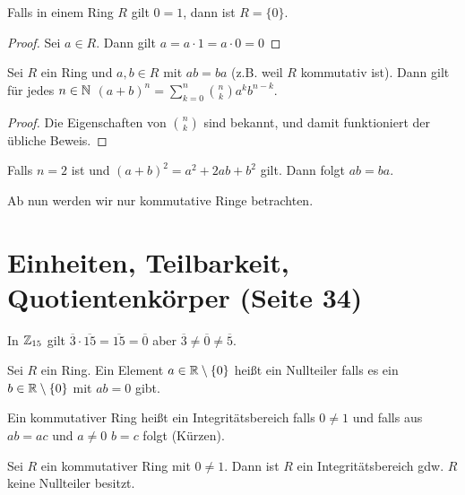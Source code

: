 \begin{lemma}
	Falls in einem Ring $R$ gilt $0=1$, dann ist  $R = \{0\}$.
\end{lemma}

\begin{proof}
	Sei $a \in R$. Dann gilt $a = a\cdot 1 = a \cdot 0 = 0$
\end{proof}

\begin{lemma}[Binomialformel]
	Sei $R$ ein Ring und $a,b \in R$ mit $ab = ba$ (z.B. weil $R$ kommutativ ist).
	Dann gilt für jedes $n \in \mathbb{N}$ $(a+b)^{n} = \sum_{k=0}^{n} \binom{n}{k} a^{k} b^{n-k}$.
\end{lemma}

\begin{proof}
	Die Eigenschaften von $\binom{n}{k}$ sind bekannt, und damit funktioniert der übliche Beweis.
\end{proof}

Falls $n = 2$ ist und $(a+b)^2 = a^2 + 2ab + b^2$ gilt. Dann folgt $ab = ba$.

\begin{attention}
	Ab nun werden wir nur kommutative Ringe betrachten.
\end{attention}

\section{Einheiten, Teilbarkeit, Quotientenkörper (Seite 34)}
\begin{eg}
	In $\mathbb{Z}_{15}$ gilt $\overline{3} \cdot \overline{15} = \overline{15} = \overline{0}$ aber  $\overline{3} \neq \overline{0} \neq \overline{5}$.
\end{eg}

\begin{definition}
	Sei $R$ ein Ring. Ein Element $a \in \mathbb{R} \setminus \{0\}$ heißt ein Nullteiler falls es ein $b \in \mathbb{R} \setminus \{0\} $ mit $ab = 0$ gibt.
\end{definition}

\begin{definition}
	Ein kommutativer Ring heißt ein Integritätsbereich falls $0 \neq 1$ und falls aus $ab = ac$ und $a\neq 0$ $b = c$ folgt (Kürzen).
\end{definition}

\begin{lemma}
	Sei $R$ ein kommutativer Ring mit $0 \neq 1$. Dann ist $R$ ein Integritätsbereich gdw. $R$ keine Nullteiler besitzt.
\end{lemma}

